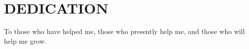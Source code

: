 \chapter*{DEDICATION}

To those who have helped me, those who presently help me, and those
who will help me grow.

